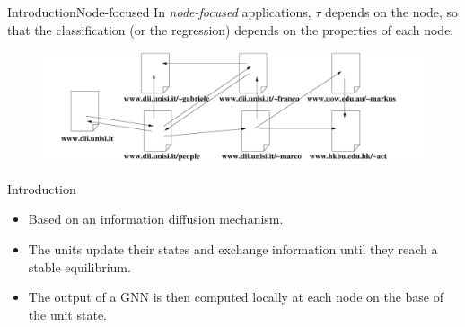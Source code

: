 \documentclass[10pt,aspectratio=169]{beamer}
\begin{document}
\begin{frame}{Introduction}{Node-focused}
    In \emph{node-focused} applications, $\tau$ depends on the node, so that the classification (or the regression) depends on the properties of each node.

    \begin{figure}
        \centering
        \includegraphics[width=.8\textwidth]{pic/website.png}
    \end{figure}
\end{frame}

\begin{frame}{Introduction}
    \begin{itemize}
        \item Based on an information diffusion mechanism.
        \item The units update their states and exchange information until they reach a stable equilibrium.
        \item The output of a GNN is then computed locally at each node on the base of the unit state.
    \end{itemize}
\end{frame}
\end{document}
